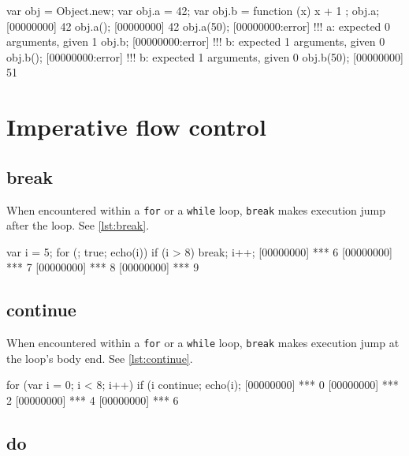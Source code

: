 \begin{urbiscript}[caption=Sending messages, label=lst:send-message,
  float=\floatpos]
  var obj = Object.new;
  var obj.a = 42;
  var obj.b = function (x) { x + 1 };
  obj.a;
  [00000000] 42
  obj.a();
  [00000000] 42
  obj.a(50);
  [00000000:error] !!! a: expected 0 arguments, given 1
  obj.b;
  [00000000:error] !!! b: expected 1 arguments, given 0
  obj.b();
  [00000000:error] !!! b: expected 1 arguments, given 0
  obj.b(50);
  [00000000] 51
\end{urbiscript}

\FloatBarrier
\section{Imperative flow control}

\subsection{break}

When encountered within a \lstinline|for| or a \lstinline|while| loop,
\lstinline|break| makes execution jump after the loop. See
\autoref{lst:break}.

\begin{urbiscript}[caption=Using break, label=lst:break,
  float=\floatpos]
  var i = 5;
  for (; true; echo(i))
  {
    if (i > 8)
      break;
    i++;
  }
  [00000000] *** 6
  [00000000] *** 7
  [00000000] *** 8
  [00000000] *** 9
\end{urbiscript}

\subsection{continue}

When encountered within a \lstinline|for| or a \lstinline|while| loop,
\lstinline|break| makes execution jump at the loop's body end. See
\autoref{lst:continue}.

\begin{urbiscript}[caption=Using continue, label=lst:continue,
  float=\floatpos]
  for (var i = 0; i < 8; i++)
  {
    if (i %
      continue;
    echo(i);
  }
  [00000000] *** 0
  [00000000] *** 2
  [00000000] *** 4
  [00000000] *** 6
\end{urbiscript}

\subsection{do}

